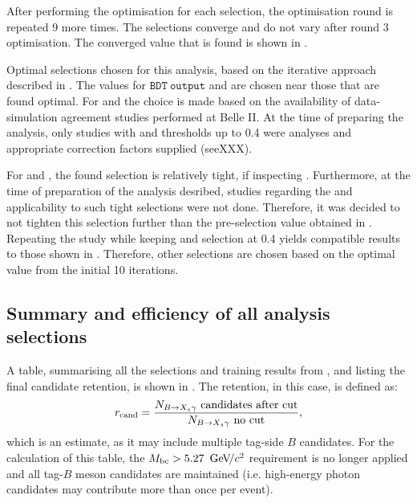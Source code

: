 After performing the optimisation for each selection, the optimisation round is repeated 9 more times.
The selections converge and do not vary after round 3 optimisation.
The converged value that is found is shown in .

\begin{table}[htbp!]
    \centering
    \caption{\label{tab:interative_optimisation} Optimal selections chosen for this analysis, based on the iterative approach described in .
    The values for $\mathtt{BDT~output}$ and \ZMVA are chosen near those that are found optimal.
    For \piVeto and \etaVeto the choice is made based on the availability of data-simulation agreement studies performed at Belle II.
    At the time of preparing the analysis, only studies with \piVeto and \etaVeto thresholds up to 0.4 were analyses and appropriate correction factors supplied (seeXXX).
    }
    
\end{table}

For \piVeto and \etaVeto, the found selection is relatively tight, if inspecting .
Furthermore, at the time of preparation of the analysis desribed, studies regarding the \piVeto and \etaVeto applicability to such tight selections were not done.
Therefore, it was decided to not tighten this selection further than the pre-selection value obtained in .
Repeating the study while keeping \piVeto and \etaVeto selection at 0.4 yields compatible results to those shown in .
Therefore, other selections are chosen based on the optimal value from the initial 10 iterations.

\subsection{Summary and efficiency of all analysis selections}\label{sec:selection_summary}

A table, summarising all the selections and \BDT training results from ,
and listing the final \BtoXsgamma candidate retention, is shown in .
The retention, in this case, is defined as:
\begin{equation}\label{eq:loose_efficiency}
    r_{\mathrm{cand}} = \frac{N_{\BtoXsgamma}~\mathrm{candidates~after~cut}}{N_{\BtoXsgamma}~\mathrm{no~cut}},
\end{equation}
which is an estimate, as it may include multiple tag-side $B$ candidates.
For the calculation of this table, the ${M_{\mathrm{bc}}}>5.27~{\mathrm{\,Ge\kern -0.1em V\!/}c^2}$ requirement is no longer applied and all tag-$B$ meson candidates are maintained (i.e. high-energy photon candidates may contribute more than once per event).

